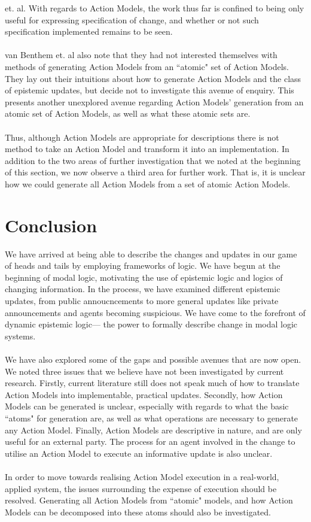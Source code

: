 \documentclass[12pt, a4paper, twoside]{article}
\begin{document}
et. al.
With regards to Action Models, the work thus far is confined to being only
useful for expressing specification of change, and whether or not such
specification implemented remains to be seen.\\
\\
van Benthem et. al also note that they had not interested themselves with methods of
generating Action Models from an ``atomic" set of Action Models. \citep{benthem2006lcc}
They lay out their intuitions about how to generate Action Models and the class
of epistemic updates, but decide not to investigate this avenue of enquiry.
This presents another unexplored avenue regarding Action Models' generation from
an atomic set of Action Models, as well as what these atomic sets are.\\
\\
Thus, although Action Models are appropriate for descriptions there is not
method to take an Action Model and transform it into an implementation.
In addition to the two areas of further investigation that we noted at the
beginning of this section, we now observe a third area for further work.
That is, it is unclear how we could generate all Action Models from a
set of atomic Action Models.

\section{Conclusion} \label{conc}
We have arrived at being able to describe the changes and updates in our game of
heads and tails by employing frameworks of logic.
We have begun at the beginning of modal logic, motivating the use of epistemic
logic and logics of changing information.
In the process, we have examined different epistemic updates, from public
annoucncements to more general updates like private announcements and agents
becoming suspicious.
We have come to the forefront of dynamic epistemic logic--- the
power to formally describe change in modal logic systems.\\
\\
We have also explored some of the gaps and possible avenues that are now open.
We noted three issues that we believe have not been investigated by current
research.
Firstly, current literature still does not speak much of how to translate Action Models
into implementable, practical updates.
Secondly, how Action Models can be generated is unclear, especially with regards to what
the basic ``atoms" for generation are, as well as what operations are necessary
to generate any Action Model.
Finally, Action Models are descriptive in nature, and are only useful for an
external party.
The process for an agent involved in the change to utilise an Action Model to
execute an informative update is also unclear.\\
\\
In order to move towards realising Action Model execution in a real-world,
applied system, the issues surrounding the expense of execution should be resolved.
Generating all Action Models from ``atomic" models, and how Action Models can be
decomposed into these atoms should also be investigated.



\end{document}
